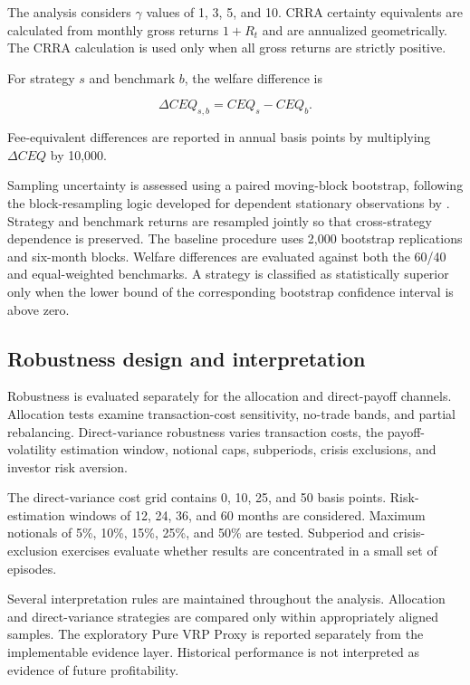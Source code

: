 The analysis considers $\gamma$ values of 1, 3, 5, and 10. CRRA certainty equivalents are calculated from monthly gross returns $1+R_t$ and are annualized geometrically. The CRRA calculation is used only when all gross returns are strictly positive.

For strategy $s$ and benchmark $b$, the welfare difference is

\begin{equation}
\Delta CEQ_{s,b}
=
CEQ_s
-
CEQ_b.
\end{equation}

Fee-equivalent differences are reported in annual basis points by multiplying $\Delta CEQ$ by 10,000.

Sampling uncertainty is assessed using a paired moving-block bootstrap, following the block-resampling logic developed for dependent stationary observations by \textcite{Kunsch1989}. Strategy and benchmark returns are resampled jointly so that cross-strategy dependence is preserved. The baseline procedure uses 2,000 bootstrap replications and six-month blocks. Welfare differences are evaluated against both the 60/40 and equal-weighted benchmarks. A strategy is classified as statistically superior only when the lower bound of the corresponding bootstrap confidence interval is above zero.

\subsection{Robustness design and interpretation}

Robustness is evaluated separately for the allocation and direct-payoff channels. Allocation tests examine transaction-cost sensitivity, no-trade bands, and partial rebalancing. Direct-variance robustness varies transaction costs, the payoff-volatility estimation window, notional caps, subperiods, crisis exclusions, and investor risk aversion.

The direct-variance cost grid contains 0, 10, 25, and 50 basis points. Risk-estimation windows of 12, 24, 36, and 60 months are considered. Maximum notionals of 5\%, 10\%, 15\%, 25\%, and 50\% are tested. Subperiod and crisis-exclusion exercises evaluate whether results are concentrated in a small set of episodes.

Several interpretation rules are maintained throughout the analysis. Allocation and direct-variance strategies are compared only within appropriately aligned samples. The exploratory Pure VRP Proxy is reported separately from the implementable evidence layer. Historical performance is not interpreted as evidence of future profitability.


